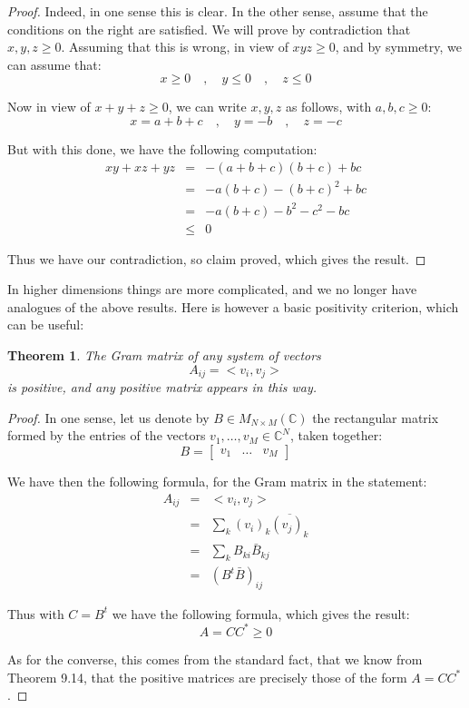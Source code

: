 \documentclass[12pt]{amsbook}
\newtheorem{theorem}{Theorem}[chapter]
\begin{document}
\begin{proof}
Indeed, in one sense this is clear. In the other sense, assume that the conditions on the right are satisfied. We will prove by contradiction that $x,y,z\geq0$. Assuming that this is wrong, in view of $xyz\geq0$, and by symmetry, we can assume that:
$$x\geq 0\quad,\quad y\leq 0\quad,\quad z\leq0$$

Now in view of $x+y+z\geq0$, we can write $x,y,z$ as follows, with $a,b,c\geq0$:
$$x=a+b+c\quad,\quad y=-b\quad,\quad z=-c$$

But with this done, we have the following computation:
\begin{eqnarray*}
xy+xz+yz
&=&-(a+b+c)(b+c)+bc\\
&=&-a(b+c)-(b+c)^2+bc\\
&=&-a(b+c)-b^2-c^2-bc\\
&\leq&0
\end{eqnarray*}

Thus we have our contradiction, so claim proved, which gives the result.
\end{proof}

In higher dimensions things are more complicated, and we no longer have analogues of the above results. Here is however a basic positivity criterion, which can be useful:

\begin{theorem}
The Gram matrix of any system of vectors
$$A_{ij}=<v_i,v_j>$$
is positive, and any positive matrix appears in this way.
\end{theorem}

\begin{proof}
In one sense, let us denote by $B\in M_{N\times M}(\mathbb C)$ the rectangular matrix formed by the entries of the vectors $v_1,\ldots,v_M\in\mathbb C^N$, taken together:
$$B=\begin{bmatrix}v_1&\ldots&v_M\end{bmatrix}$$

We have then the following formula, for the Gram matrix in the statement:
\begin{eqnarray*}
A_{ij}
&=&<v_i,v_j>\\
&=&\sum_k(v_i)_k\overline{(v_j)_k}\\
&=&\sum_kB_{ki}\bar{B}_{kj}\\
&=&(B^t\bar{B})_{ij}
\end{eqnarray*}

Thus with $C=B^t$ we have the following formula, which gives the result:
$$A=CC^*\geq0$$ 

As for the converse, this comes from the standard fact, that we know from Theorem 9.14, that the positive matrices are precisely those of the form $A=CC^*$.
\end{proof}
\end{document}
